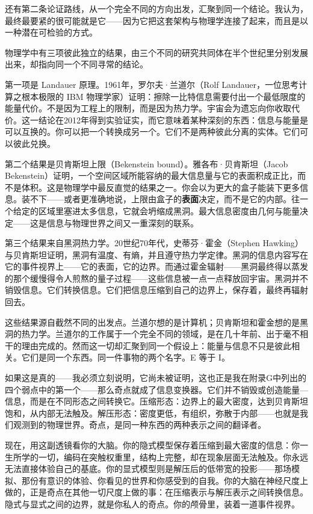 \documentclass[11pt, twoside, openright]{book}
\begin{document}
还有第二条论证路线，从一个完全不同的方向出发，汇聚到同一个结论。我认为，最终最要紧的很可能就是它------因为它把这套架构与物理学连接了起来，而且是以一种潜在可检验的方式。

物理学中有三项彼此独立的结果，由三个不同的研究共同体在半个世纪里分别发展出来，却指向同一个不同寻常的结论。

第一项是 Landauer 原理。1961年，罗尔夫·兰道尔（Rolf Landauer，一位思考计算之根本极限的 IBM 物理学家）证明：擦除一比特信息需要付出一个最低限度的能量代价。不是因为工程上的限制，而是因为热力学。宇宙会为遗忘向你收取代价。这一结论在2012年得到实验证实，而它意味着某种深刻的东西：信息与能量是可以互换的。你可以把一个转换成另一个。它们不是两种彼此分离的实体。它们可以彼此兑换。

第二个结果是贝肯斯坦上限（Bekenstein bound）。雅各布·贝肯斯坦（Jacob Bekenstein）证明，一个空间区域所能容纳的最大信息量与它的表面积成正比，而不是体积。这是物理学中最反直觉的结果之一。你会以为更大的盒子能装下更多信息。装不下------或者更准确地说，上限由盒子的\textbf{表面}决定，而不是它的内部。往一个给定的区域里塞进太多信息，它就会坍缩成黑洞。最大信息密度由几何与能量决定------这是信息与物理世界之间又一重深刻的联系。

第三个结果来自黑洞热力学。20世纪70年代，史蒂芬·霍金（Stephen Hawking）与贝肯斯坦证明，黑洞有温度、有熵，并且遵守热力学定律。黑洞的信息内容写在它的事件视界上------它的表面，它的边界。而通过霍金辐射------黑洞最终得以蒸发的那个缓慢得令人煎熬的量子过程------这些信息被一点一点释放回宇宙。黑洞并不销毁信息。它们转换信息。它们把信息压缩到自己的边界上，保存着，最终再辐射回去。

这些结果源自截然不同的出发点。兰道尔想的是计算机；贝肯斯坦和霍金想的是黑洞的热力学。兰道尔的工作属于一个完全不同的领域，是在几十年前、出于毫不相干的理由完成的。然而这一切却汇聚到同一个假设上：能量与信息不只是彼此相关。它们是同一个东西。同一件事物的两个名字。E 等于 I。

如果这是真的------我必须立刻说明，它尚未被证明，这也正是我在附录G中列出的四个弱点中的第一个------那么奇点就成了信息变换器。它们并不销毁或创造能量---信息，而是在不同形态之间转换它。压缩形态：边界上的最大密度，达到贝肯斯坦饱和，从内部无法触及。解压形态：密度更低，有组织，弥散于内部------也就是我们观测到的物理世界。奇点，是同一种东西的两种表示之间的翻译者。

现在，用这副透镜看你的大脑。你的隐式模型保存着压缩到最大密度的信息：你一生所学的一切，编码在突触权重里，结构上完整，却在现象层面无法触及。你永远无法直接体验自己的基底。你的显式模型则是解压后的低带宽的投影------那场模拟、那份有意识的体验、你看见的世界和你感受到的自我。你的大脑在神经尺度上做的，正是奇点在其他一切尺度上做的事：在压缩表示与解压表示之间转换信息。隐式与显式之间的边界，就是你私人的奇点。你的颅骨里，装着一道事件视界。
\end{document}
